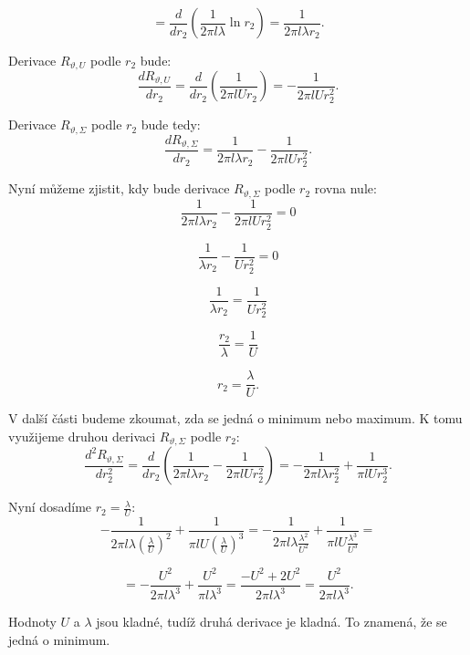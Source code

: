 \documentclass{article}
\begin{document}
$$
    = \frac{d}{dr_2} \left( \frac{1}{2 \pi l \lambda} \ln r_2 \right) = \frac{1}{2 \pi l \lambda r_2}.
$$

Derivace $R_{\vartheta,U}$ podle $r_2$ bude:
$$
    \frac{dR_{\vartheta,U}}{dr_2} = \frac{d}{dr_2} \left( \frac{1}{2 \pi l U r_2} \right) = -\frac{1}{2 \pi l U r_2^2}.
$$

Derivace $R_{\vartheta,\Sigma}$ podle $r_2$ bude tedy:
$$
    \frac{dR_{\vartheta,\Sigma}}{dr_2} = \frac{1}{2 \pi l \lambda r_2} - \frac{1}{2 \pi l U r_2^2}.
$$

Nyní můžeme zjistit, kdy bude derivace $R_{\vartheta,\Sigma}$ podle $r_2$ rovna nule:
$$
    \frac{1}{2 \pi l \lambda r_2} - \frac{1}{2 \pi l U r_2^2} = 0
$$

$$
    \frac{1}{\lambda r_2} - \frac{1}{U r_2^2} = 0
$$

$$
    \frac{1}{\lambda r_2} = \frac{1}{U r_2^2}
$$

$$
    \frac{r_2}{\lambda} = \frac{1}{U}
$$

$$
    r_2 = \frac{\lambda}{U}.
$$

V další části budeme zkoumat, zda se jedná o minimum nebo maximum. K tomu využijeme druhou derivaci $R_{\vartheta,\Sigma}$ podle $r_2$:
$$
    \frac{d^2R_{\vartheta,\Sigma}}{dr_2^2} = \frac{d}{dr_2} \left( \frac{1}{2 \pi l \lambda r_2} - \frac{1}{2 \pi l U r_2^2} \right) = -\frac{1}{2 \pi l \lambda r_2^2} + \frac{1}{\pi l U r_2^3}.
$$

Nyní dosadíme $r_2 = \frac{\lambda}{U}$:
$$
    -\frac{1}{2 \pi l \lambda \left( \frac{\lambda}{U} \right)^2} + \frac{1}{\pi l U \left( \frac{\lambda}{U} \right)^3} = -\frac{1}{2 \pi l \lambda \frac{\lambda^2}{U^2}} + \frac{1}{\pi l U \frac{\lambda^3}{U^3}} =
$$

$$
    = -\frac{U^2}{2 \pi l \lambda^3} + \frac{U^2}{\pi l \lambda^3} = \frac{-U^2 + 2 U^2}{2 \pi l \lambda^3} = \frac{U^2}{2 \pi l \lambda^3}.
$$

Hodnoty $U$ a $\lambda$ jsou kladné, tudíž druhá derivace je kladná. To znamená, že se jedná o minimum.

\begin{center}
\end{center}
\end{document}

